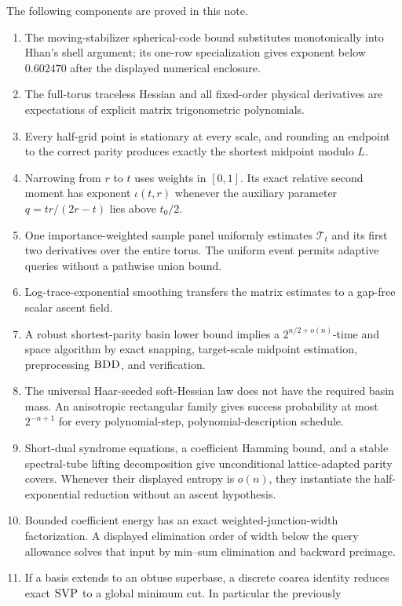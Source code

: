 \documentclass[10pt]{article}
\theoremstyle{definition}
\newcommand{\SVP}{\textnormal{\textsc{SVP}}}
\newcommand{\BDD}{\textnormal{\textsc{BDD}}}
\newcommand{\cT}{\mathcal{T}}
\begin{document}
The following components are proved in this note.
\begin{enumerate}[leftmargin=2em]
\item The moving-stabilizer spherical-code bound substitutes monotonically
into Hhan's shell argument; its one-row specialization gives exponent below
$0.602470$ after the displayed numerical enclosure.
\item The full-torus traceless Hessian and all fixed-order physical
derivatives are expectations of explicit matrix trigonometric polynomials.
\item Every half-grid point is stationary at every scale, and rounding an
endpoint to the correct parity produces exactly the shortest midpoint modulo
$L$.
\item Narrowing from $r$ to $t$ uses weights in $[0,1]$.  Its exact relative
second moment has exponent $\iota(t,r)$ whenever the auxiliary parameter
$q=tr/(2r-t)$ lies above $t_0/2$.
\item One importance-weighted sample panel uniformly estimates $\cT_t$ and
its first two derivatives over the entire torus.  The uniform event permits
adaptive queries without a pathwise union bound.
\item Log-trace-exponential smoothing transfers the matrix estimates to a
gap-free scalar ascent field.
\item A robust shortest-parity basin lower bound implies a
$2^{n/2+o(n)}$-time and space algorithm by exact snapping, target-scale
midpoint estimation, preprocessing $\BDD$, and verification.
\item The universal Haar-seeded soft-Hessian law does not have the required
basin mass.  An anisotropic rectangular family gives success probability at
most $2^{-n+1}$ for every polynomial-step, polynomial-description schedule.
\item Short-dual syndrome equations, a coefficient Hamming bound, and a
stable spectral-tube lifting decomposition give unconditional
lattice-adapted parity covers.  Whenever their displayed entropy is $o(n)$,
they instantiate the half-exponential reduction without an ascent
hypothesis.
\item Bounded coefficient energy has an exact weighted-junction-width
factorization.  A displayed elimination order of width below the query
allowance solves that input by min--sum elimination and backward preimage.
\item If a basis extends to an obtuse superbase, a discrete coarea identity
reduces exact $\SVP$ to a global minimum cut.  In particular the previously

\end{enumerate}
\end{document}
